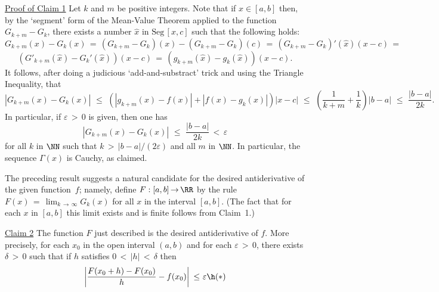 {        \underline{Proof of Claim 1} Let $k$ and $m$ be positive integers. Note that if $x{\in}[a,b]$ then, by the `segment' form of the Mean-Value Theorem applied to the function $G_{k+m} - G_{k}$, there exists a number $\hat{x}$ in ${\mbox{Seg}\,[x,c]}$ such that the following holds:
        \begin{displaymath}
        G_{k+m}(x) - G_{k}(x) \,=\, (G_{k+m} - G_{k})(x) - (G_{k+m} - G_{k})(c)
     \,=\, 
        (G_{k+m} - G_{k})'(\hat{x})(x-c) \,=\,
        \end{displaymath}
        \begin{displaymath}
         (G'_{k+m}(\hat{x}) - G_{k}'(\hat{x}))(x-c)
     \,=\, 
       (g_{k+m}(\hat{x}) - g_{k}(\hat{x}))(x-c).
        \end{displaymath}
    It follows, after doing a judicious `add-and-substract' trick and using the Triangle Inequality, that
        \begin{displaymath}
        |G_{k+m}(x) - G_{k}(x)|\,\,{\leq}\,\,\left(|g_{k+m}(x) - f(x)| + |f(x) - g_{k}(x)|\right)|x-c|\,\,{\leq}\,\,\left(\frac{1}{k+m} + \frac{1}{k}\right)|b-a|\,\,{\leq}\,\,\frac{|b-a|}{2k}.
        \end{displaymath}
    In particular, if ${\varepsilon}\,>\,0$ is given, then one has
        \begin{equation}
        \label{IneqE.83A}
        |G_{k+m}(x) - G_{k}(x)|\,\,{\leq}\,\,\frac{|b-a|}{2k}\,<\,{\varepsilon}
        \end{equation}
    for all $k$ in ${\NN}$ such that $k\,>\,|b-a|/(2{\varepsilon})$ and all $m$ in ${\NN}$. In particular, the sequence ${\Gamma}(x)$ is Cauchy, as claimed.

        The preceding result suggests a natural candidate for the desired antiderivative of the given function~$f$; namely,
    define $F:[a,b] \,{\rightarrow}\, {\RR}$ by the rule $F(x) \,=\, \lim_{k \,{\rightarrow}\, {\infty}} G_{k}(x)$ for all $x$ in the interval $[a,b]$.
    (The fact that for each $x$ in $[a,b]$ this limit exists and is finite follows from Claim~1.)

\V

    \underline{Claim 2} The function $F$ just described is the desired antiderivative of $f$.
    More precisely, for each $x_{0}$ in the open interval $(a,b)$ and for each ${\varepsilon}\,>\,0$,
    there exists ${\delta}\,>\,0$ such that if $h$ satisfies $0\,<\,|h|\,<\,{\delta}$ then
        \begin{displaymath}
        \left|\frac{F(x_{0} + h) - F(x_{0})}{h} - f(x_{0})\right|\,\,{\leq}\,\,{\varepsilon} \h ({\ast})
        \end{displaymath}

}
